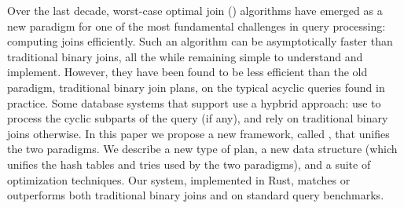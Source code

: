 Over the last decade, worst-case optimal join (\WCOJ) algorithms have
emerged as a new paradigm for one of the most fundamental challenges
in query processing: computing joins efficiently.  Such an algorithm
can be asymptotically faster than traditional binary joins, all the
while remaining simple to understand and implement.  However, they
have been found to be less efficient than the old paradigm,
traditional binary join plans, on the typical acyclic queries found in
practice.  Some database systems that support \WCOJ use a hypbrid
approach: use \WCOJ to process the cyclic subparts of the query (if
any), and rely on traditional binary joins otherwise.  In this paper
we propose a new framework, called \FJ, that unifies the two
paradigms.  We describe a new type of plan, a new data structure
(which unifies the hash tables and tries used by the two paradigms),
and a suite of optimization techniques.  Our system, implemented in
Rust, matches or outperforms both traditional binary joins and \GJ on
standard query benchmarks.